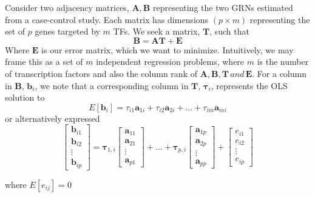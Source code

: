 \documentclass[9pt,twocolumn,twoside]{pnas-new}
\begin{document}
Consider two adjacency matrices, $\mathbf{A},\mathbf{B}$ representing
the two GRNs estimated from a case-control study. Each matrix has
dimensions $\left(p\times m\right)$ representing the set of $p$
genes targeted by $m$ TFs. We seek a matrix, $\mathbf{T}$, such
that 
\[
\mathbf{B}=\mathbf{AT}+\mathbf{E}
\]
Where $\mathbf{E}$ is our error matrix, which we want to minimize.
Intuitively, we may frame this as a set of $m$ independent regression
problems, where $m$ is the number of transcription factors and also
the column rank of $\mathbf{A},\mathbf{B},\mathbf{T}\,and\,\mathbf{E}$.
For a column in $\mathbf{B}$, $\mathbf{b}_{i}$, we note that a corresponding
column in $\mathbf{T}$, $\mathbf{\tau}_{i}$, represents the OLS
solution to
\[
E\left[\mathbf{b}_{i}\right]=\tau_{i1}\mathbf{a}_{1i}+\tau_{i2}\mathbf{a}_{2i}+\dots+\tau_{im}\mathbf{a}_{mi}
\]
or alternatively expressed 
\[
\left[\begin{array}{c}
\mathbf{b}_{i1}\\
\mathbf{b}_{i2}\\
\vdots\\
\mathbf{b}_{ip}
\end{array}\right]=\mathbf{\tau}_{1,i}\left[\begin{array}{c}
\mathbf{a}_{11}\\
\mathbf{a}_{21}\\
\vdots\\
\mathbf{a}_{p1}
\end{array}\right]+\dots+\mathbf{\tau}_{p,i}\left[\begin{array}{c}
\mathbf{a}_{1p}\\
\mathbf{a}_{2p}\\
\vdots\\
\mathbf{a}_{pp}
\end{array}\right]+\left[\begin{array}{c}
e_{i1}\\
e_{i2}\\
\vdots\\
e_{ip}
\end{array}\right]
\]

where $E\left[e_{ij}\right]=0$ 
\end{document}
